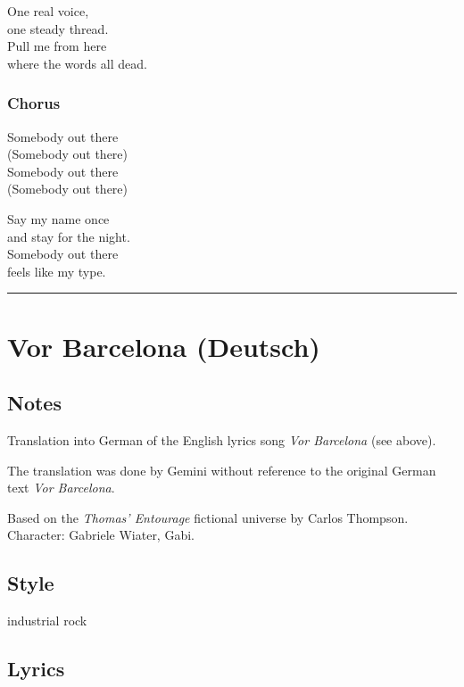 One real voice,\\
one steady thread.\\
Pull me from here\\
where the words all dead.

\subsubsection{Chorus}\label{chorus-16}

Somebody out there\\
(Somebody out there)\\
Somebody out there\\
(Somebody out there)

Say my name once\\
and stay for the night.\\
Somebody out there\\
feels like my type.

\begin{center}\rule{0.5\linewidth}{0.5pt}\end{center}

\section{Vor Barcelona (Deutsch)}\label{vor-barcelona-deutsch}

\subsection{Notes}\label{notes-9}

Translation into German of the English lyrics song \emph{Vor Barcelona}
(see above).

The translation was done by Gemini without reference to the original
German text \emph{Vor Barcelona}.

Based on the \emph{Thomas' Entourage} fictional universe by Carlos
Thompson.\\
Character: Gabriele Wiater, Gabi.

\subsection{Style}\label{style-9}

industrial rock

\subsection{Lyrics}\label{lyrics-9}


